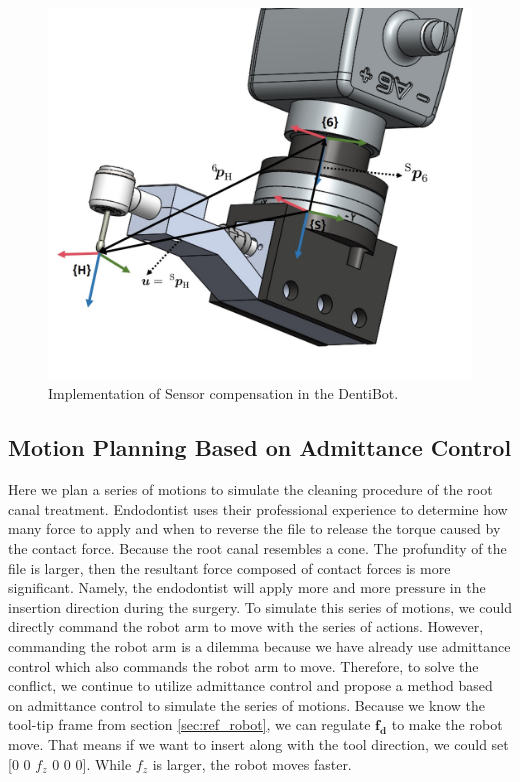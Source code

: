 \begin{figure}[htbp]
\begin{center}
\includegraphics[width=0.7	\linewidth]{Images/sensor_comp 3.jpg}
\caption{
Implementation of Sensor compensation in the DentiBot.
}\label{fig:sensor_comp3}
\end{center}
\end{figure}


\subsection*{Motion Planning Based on Admittance Control}
\label{sec:motion planning} 
\hspace*{6mm}Here we plan a series of motions to simulate the cleaning procedure of the root canal treatment. Endodontist uses their professional experience to determine how many force to apply and when to reverse the file to release the torque caused by the contact force. Because the root canal resembles a cone. The profundity of the file is larger, then the resultant force composed of contact forces is more significant. Namely, the endodontist will apply more and more pressure in the insertion direction during the surgery. To simulate this series of motions, we could directly command the robot arm to move with the series of actions. However, commanding the robot arm is a dilemma because we have already use admittance control which also commands the robot arm to move. Therefore, to solve the conflict, we continue to utilize admittance control and propose a method based on admittance control to simulate the series of motions. Because we know the tool-tip frame from section \ref{sec:ref_robot}, we can regulate $\boldsymbol{f_d}$ to make the robot move. That means if we want to insert along with the tool direction, we could set [$0$ $0$ $f_z$ $0$ $0$ $0$]. While $f_z$ is larger, the robot moves faster.

